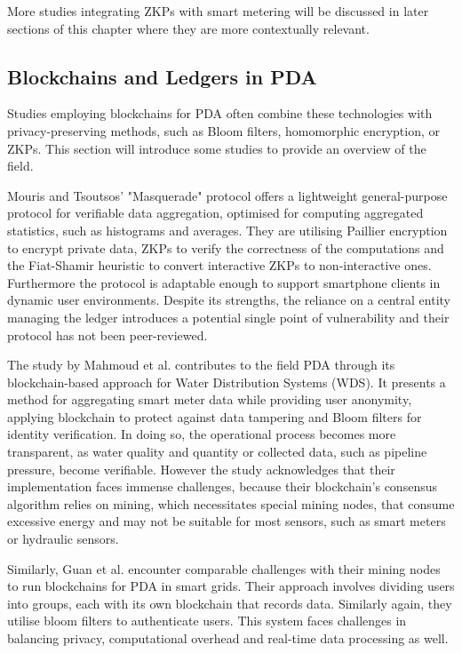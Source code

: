 More studies integrating ZKPs with smart metering will be discussed in later sections of this chapter where they are more contextually relevant.

\subsection{Blockchains and Ledgers in PDA}

Studies employing blockchains for PDA often combine these technologies with privacy-preserving methods, such as Bloom filters, homomorphic encryption, or ZKPs. This section will introduce some studies to provide an overview of the field.

Mouris and Tsoutsos’ "Masquerade" protocol \cite{masq} offers a lightweight general-purpose protocol for verifiable data aggregation, optimised for computing aggregated statistics, such as histograms and averages. They are utilising Paillier encryption to encrypt private data, ZKPs to verify the correctness of the computations and the Fiat-Shamir heuristic to convert interactive ZKPs to non-interactive ones. Furthermore the protocol is adaptable enough to support smartphone clients in dynamic user environments. Despite its strengths, the reliance on a central entity managing the ledger introduces a potential single point of vulnerability and their protocol has not been peer-reviewed.

The study by Mahmoud et al. \cite{mahmoud2019secure} contributes to the field PDA through its blockchain-based approach for Water Distribution Systems (WDS). It presents a method for aggregating smart meter data while providing user anonymity, applying blockchain to protect against data tampering and Bloom filters for identity verification. In doing so, the operational process becomes more transparent, as water quality and quantity or collected data, such as pipeline pressure, become verifiable. However the study acknowledges that their implementation faces immense challenges, because their blockchain's consensus algorithm relies on mining, which necessitates special mining nodes, that consume excessive energy and may not be suitable for most sensors, such as smart meters or hydraulic sensors.

Similarly, Guan et al. \cite{block2} encounter comparable challenges with their mining nodes to run blockchains for PDA in smart grids. Their approach involves dividing users into groups, each with its own blockchain that records data. Similarly again, they utilise bloom filters to authenticate users. This system faces challenges in balancing privacy, computational overhead and real-time data processing as well.

